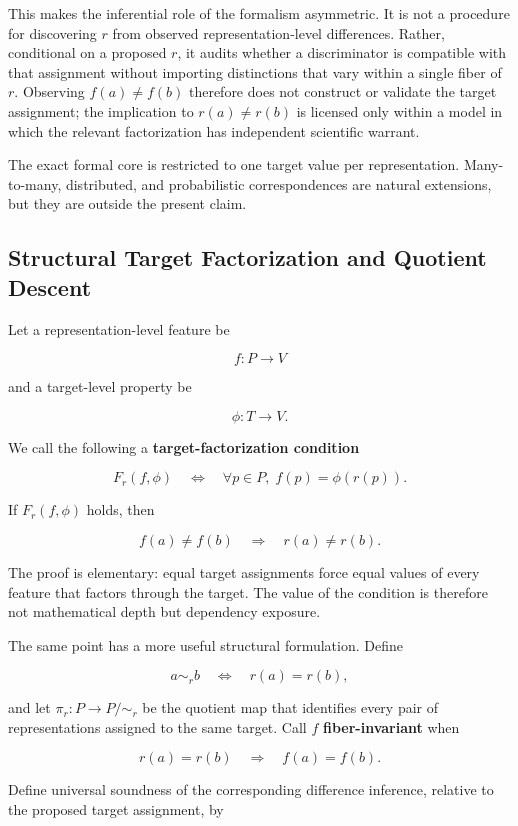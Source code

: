 \documentclass[12pt]{article}
\begin{document}
This makes the inferential role of the formalism asymmetric. It is not a procedure for discovering \(r\) from observed representation-level differences. Rather, conditional on a proposed \(r\), it audits whether a discriminator is compatible with that assignment without importing distinctions that vary within a single fiber of \(r\). Observing \(f(a)\neq f(b)\) therefore does not construct or validate the target assignment; the implication to \(r(a)\neq r(b)\) is licensed only within a model in which the relevant factorization has independent scientific warrant.

The exact formal core is restricted to one target value per representation. Many-to-many, distributed, and probabilistic correspondences are natural extensions, but they are outside the present claim.

\subsection{Structural Target Factorization and Quotient Descent}

Let a representation-level feature be

\[
f:P\to V
\]

and a target-level property be

\[
\phi:T\to V.
\]

We call the following a \textbf{target-factorization condition}

\[
F_r(f,\phi)
\quad\Longleftrightarrow\quad
\forall p\in P,\; f(p)=\phi(r(p)).
\]

If \(F_r(f,\phi)\) holds, then

\[
f(a)\neq f(b)
\quad\Longrightarrow\quad
r(a)\neq r(b).
\]

The proof is elementary: equal target assignments force equal values of every feature that factors through the target. The value of the condition is therefore not mathematical depth but dependency exposure.

The same point has a more useful structural formulation. Define

\[
a\sim_r b
\quad\Longleftrightarrow\quad
r(a)=r(b),
\]

and let \(\pi_r:P\to P/{\sim_r}\) be the quotient map that identifies every pair of representations assigned to the same target. Call \(f\) \textbf{fiber-invariant} when

\[
r(a)=r(b)
\quad\Longrightarrow\quad
f(a)=f(b).
\]

Define universal soundness of the corresponding difference inference, relative to the proposed target assignment, by
\end{document}
